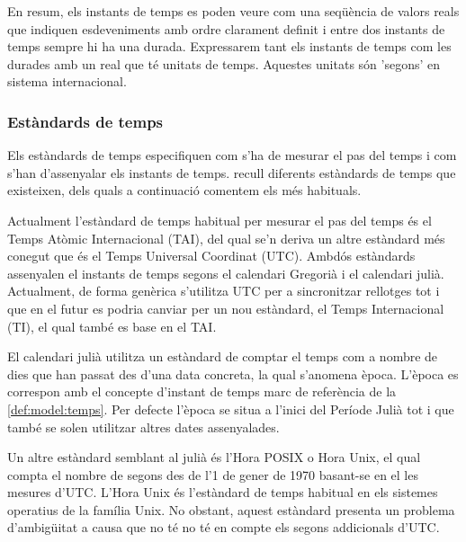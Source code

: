 En resum, els instants de temps es poden veure com una seqüència de
valors reals que indiquen esdeveniments amb ordre clarament definit i
entre dos instants de temps sempre hi ha una durada. Expressarem tant
els instants de temps com les durades amb un real que té unitats de
temps. Aquestes unitats són 'segons' en sistema internacional.




\subsubsection{Estàndards de temps}

Els estàndards de temps especifiquen com s'ha de mesurar el pas del
temps i com s'han d'assenyalar els instants de temps.
\textcite{allen:timescales} recull diferents estàndards de temps
que existeixen, dels quals a continuació comentem els més habituals.

Actualment l'estàndard de temps habitual per mesurar el pas del temps
és el Temps Atòmic Internacional (TAI), del qual se'n deriva un altre
estàndard més conegut que és el Temps Universal Coordinat (UTC).
Ambdós estàndards assenyalen el instants de temps segons el calendari
Gregorià i el calendari julià. Actualment, de forma genèrica s'utilitza
UTC per a sincronitzar rellotges tot i que en el futur es podria
canviar per un nou estàndard, el Temps Internacional (TI), el qual
també es base en el TAI.

El calendari julià utilitza un estàndard de comptar el temps com a
nombre de dies que han passat des d'una data concreta, la qual
s'anomena època. L'època es correspon amb el concepte d'instant de
temps marc de referència de la \autoref{def:model:temps}. Per defecte
l'època se situa a l'inici del Període Julià tot i que també se solen
utilitzar altres dates assenyalades.

Un altre estàndard semblant al julià és l'Hora POSIX o Hora Unix, el
qual compta el nombre de segons des de l'1 de gener de 1970 basant-se
en el les mesures d'UTC. L'Hora Unix és l'estàndard de temps habitual
en els sistemes operatius de la família Unix. No obstant, aquest
estàndard presenta un problema d'ambigüitat a causa que no té no té en
compte els segons addicionals d'UTC.






